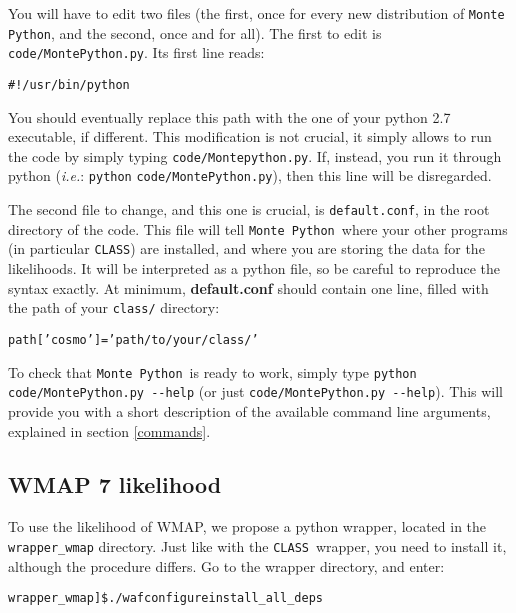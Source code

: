 \documentclass[10pt]{article}
\newcommand{\CLASS}{\texttt{CLASS}}
\newcommand{\MP}{\texttt{Monte Python}}
\begin{document}
 You will have to edit two files (the first, once for every new distribution of \MP, and
 the second, once and for all). The first to edit is
 \verb?code/MontePython.py?. Its first line reads:

 \begin{alltt}
    #!/usr/bin/python
 \end{alltt}

 You should eventually replace this path with the one of your python 2.7 executable, if different.
 This modification is not crucial, it simply allows to run the code by simply typing \verb?code/Montepython.py?.
 If, instead, you run it through python (\emph{i.e.}: \verb?python?
 \verb?code/MontePython.py?), then this line will be disregarded.

 The second file to change, and this one is crucial, is \verb?default.conf?, in
 the root directory of the code. This file will tell \MP\, where your
 other programs (in particular \CLASS) are installed, and where you are storing the data for the
 likelihoods. It will be interpreted as a python file, so be careful to
 reproduce the syntax exactly. At minimum, {\bf default.conf} should contain one line, filled with the path of your \verb?class/? directory:
 \begin{alltt}
   path['cosmo']   = 'path/to/your/class/'
 \end{alltt}
 
 
 To check that \MP~is ready to work, simply type \verb?python code/MontePython.py --help? (or just \verb?code/MontePython.py --help?). This will provide you with a short description of the available command line arguments, explained in section \ref{commands}. 

 \subsection{WMAP 7 likelihood}

  To use the likelihood of WMAP, we propose a python wrapper, located in the
  \verb?wrapper_wmap? directory. Just like with the \CLASS~wrapper, you need to
  install it, although the procedure differs. Go to the wrapper directory, and enter:

  \begin{alltt}
    wrapper_wmap]\$ ./waf configure install_all_deps
  \end{alltt}
\end{document}
